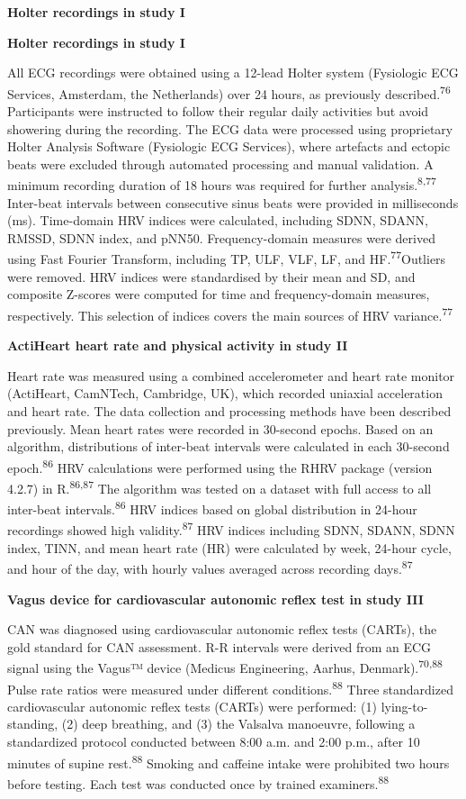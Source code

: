 \documentclass[
  a4paper,
  headsepline=true,
  open=any]{scrbook}
\begin{document}
\textbf{Holter recordings in study I}

\textbf{Holter recordings in study I}

All ECG recordings were obtained using a 12-lead Holter system
(Fysiologic ECG Services, Amsterdam, the Netherlands) over 24 hours, as
previously described.\textsuperscript{76} Participants were instructed
to follow their regular daily activities but avoid showering during the
recording. The ECG data were processed using proprietary Holter Analysis
Software (Fysiologic ECG Services), where artefacts and ectopic beats
were excluded through automated processing and manual validation. A
minimum recording duration of 18 hours was required for further
analysis.\textsuperscript{8,77} Inter-beat intervals between consecutive
sinus beats were provided in milliseconds (ms). Time-domain HRV indices
were calculated, including SDNN, SDANN, RMSSD, SDNN index, and pNN50.
Frequency-domain measures were derived using Fast Fourier Transform,
including TP, ULF, VLF, LF, and HF.\textsuperscript{77}Outliers were
removed. HRV indices were standardised by their mean and SD, and
composite Z-scores were computed for time and frequency-domain measures,
respectively. This selection of indices covers the main sources of HRV
variance.\textsuperscript{77}

\textbf{ActiHeart heart rate and physical activity in study II}

Heart rate was measured using a combined accelerometer and heart rate
monitor (ActiHeart, CamNTech, Cambridge, UK), which recorded uniaxial
acceleration and heart rate. The data collection and processing methods
have been described previously. Mean heart rates were recorded in
30-second epochs. Based on an algorithm, distributions of inter-beat
intervals were calculated in each 30-second epoch.\textsuperscript{86}
HRV calculations were performed using the RHRV package (version 4.2.7)
in R.\textsuperscript{86,87} The algorithm was tested on a dataset with
full access to all inter-beat intervals.\textsuperscript{86} HRV indices
based on global distribution in 24-hour recordings showed high
validity.\textsuperscript{87} HRV indices including SDNN, SDANN, SDNN
index, TINN, and mean heart rate (HR) were calculated by week, 24-hour
cycle, and hour of the day, with hourly values averaged across recording
days.\textsuperscript{87}

\textbf{Vagus device for cardiovascular autonomic reflex test in study
III}

CAN was diagnosed using cardiovascular autonomic reflex tests (CARTs),
the gold standard for CAN assessment. R-R intervals were derived from an
ECG signal using the Vagus™ device (Medicus Engineering, Aarhus,
Denmark).\textsuperscript{70,88} Pulse rate ratios were measured under
different conditions.\textsuperscript{88} Three standardized
cardiovascular autonomic reflex tests (CARTs) were performed: (1)
lying-to-standing, (2) deep breathing, and (3) the Valsalva manoeuvre,
following a standardized protocol conducted between 8:00 a.m. and 2:00
p.m., after 10 minutes of supine rest.\textsuperscript{88} Smoking and
caffeine intake were prohibited two hours before testing. Each test was
conducted once by trained examiners.\textsuperscript{88}
\end{document}
